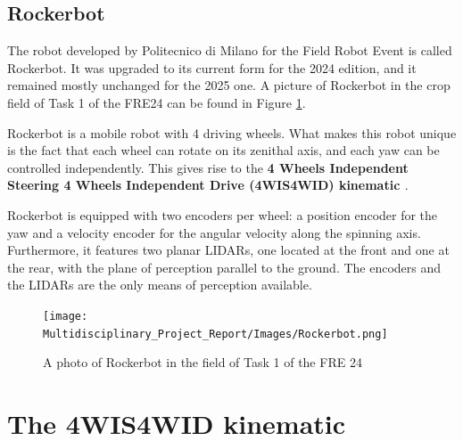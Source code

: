 \documentclass[11pt,a4paper,twocolumn]{article}
\begin{document}
\subsection{Rockerbot}
\label{sec:rockerbot}

The robot developed by Politecnico di Milano for the Field Robot Event is called Rockerbot. It was upgraded to its current form for the 2024 edition, and it remained mostly unchanged for the 2025 one. A picture of Rockerbot in the crop field of Task 1 of the FRE24 can be found in Figure \ref{fig:rockerbot}.

Rockerbot is a mobile robot with 4 driving wheels. What makes this robot unique is the fact that each wheel can rotate on its zenithal axis, and each yaw can be controlled independently. This gives rise to the \textbf{4 Wheels Independent Steering 4 Wheels Independent Drive (4WIS4WID) kinematic \cite{4WIS4WID}}.

Rockerbot is equipped with two encoders per wheel: a position encoder for the yaw and a velocity encoder for the angular velocity along the spinning axis. Furthermore, it features two planar LIDARs, one located at the front and one at the rear, with the plane of perception parallel to the ground. The encoders and the LIDARs are the only means of perception available.

\begin{figure}
    \centering
    \texttt{[image: Multidisciplinary\_Project\_Report/Images/Rockerbot.png]}
    \caption{A photo of Rockerbot in the field of Task 1 of the FRE 24}
    \label{fig:rockerbot}
\end{figure}

\section{The 4WIS4WID kinematic}
\end{document}
